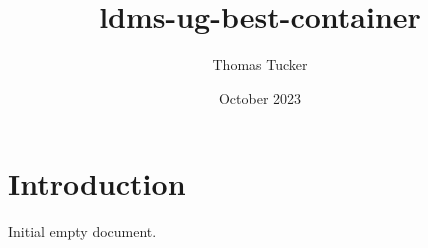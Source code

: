 \documentclass{article}
\title{ldms-ug-best-container}
\author{Thomas Tucker}
\date{October 2023}
\begin{document}
\section{Introduction}
Initial empty document.
\end{document}
